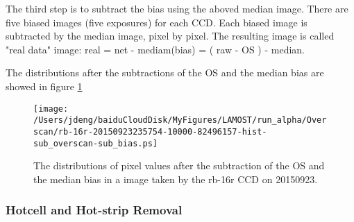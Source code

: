 \documentclass[12pt,twoside,letterpaper]{article}
\begin{document}
The third step is to subtract the bias using the aboved median image.
There are five biased images (five exposures) for each CCD. Each biased image is
subtracted by the median image, pixel by pixel. The resulting image is called
"real data" image: real = net - mediam(bias) = ( raw - OS ) - median.



The distributions after the subtractions of the OS and the median bias  
are showed in figure \ref{Fig:sub_OS_sub_bias_rb_16r}

   \begin{figure}[!htbp]
   \begin{center}
       \texttt{[image: /Users/jdeng/baiduCloudDisk/MyFigures/LAMOST/run\_alpha/Overscan/rb-16r-20150923235754-10000-82496157-hist-sub\_overscan-sub\_bias.ps]}
       \caption{The distributions of pixel values after the subtraction of the OS and the median bias in a image taken by the rb-16r CCD on 20150923.}
       \label{Fig:sub_OS_sub_bias_rb_16r}
   \end{center}    
   \end{figure}


\subsubsection{Hotcell and Hot-strip Removal} \label{sec:hotcell}
\end{document}
